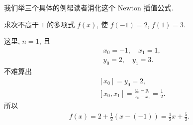 我们举三个具体的例帮读者消化这个 Newton 插值公式.

\begin{example}
    求次不高于 $1$ 的多项式 $f(x)$, 使 $f(-1)=2$, $f(1)=3$.

    这里, $n = 1$, 且
    \begin{align*}
         & x_0 = -1, \quad x_1 = 1, \\
         & y_0 = 2, \quad y_1 = 3.
    \end{align*}
    不难算出
    \begin{align*}
         & [x_0] = y_0 = 2,                                    \\
         & [x_0, x_1] = \frac{y_0 - y_1}{x_0 - x_1} = \frac12.
    \end{align*}
    所以
    \begin{align*}
        f(x) = 2 + \frac12 (x - (-1)) = \frac12 x + \frac52.
    \end{align*}
\end{example}

